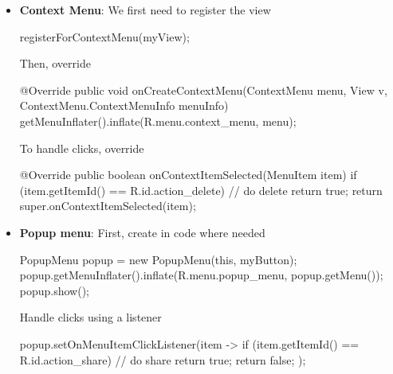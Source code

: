 \documentclass{report}
\begin{document}
\begin{itemize}
        \item \textbf{Context Menu}: We first need to register the view
            \bigbreak \noindent 
            \begin{javacode}
                registerForContextMenu(myView);
            \end{javacode}
            \bigbreak \noindent 
            Then, override
            \bigbreak \noindent 
            \begin{javacode}
                @Override
                public void onCreateContextMenu(ContextMenu menu, View v,
                ContextMenu.ContextMenuInfo menuInfo) {
                    getMenuInflater().inflate(R.menu.context_menu, menu);
                }
            \end{javacode}
            \bigbreak \noindent 
            To handle clicks, override
            \bigbreak \noindent 
            \begin{javacode}
                @Override
                public boolean onContextItemSelected(MenuItem item) {
                    if (item.getItemId() == R.id.action_delete) {
                        // do delete
                        return true;
                    }
                    return super.onContextItemSelected(item);
                }
            \end{javacode}


        \item \textbf{Popup menu}: First, create in code where needed
            \bigbreak \noindent 
            \begin{javacode}
                PopupMenu popup = new PopupMenu(this, myButton);
                popup.getMenuInflater().inflate(R.menu.popup_menu, popup.getMenu());
                popup.show();
            \end{javacode}
            \bigbreak \noindent 
            Handle clicks using a listener
            \bigbreak \noindent 
            \begin{javacode}
                popup.setOnMenuItemClickListener(item -> {
                    if (item.getItemId() == R.id.action_share) {
                        // do share
                        return true;
                    }
                    return false;
                });

            \end{javacode}
    

\end{itemize}
\end{document}

